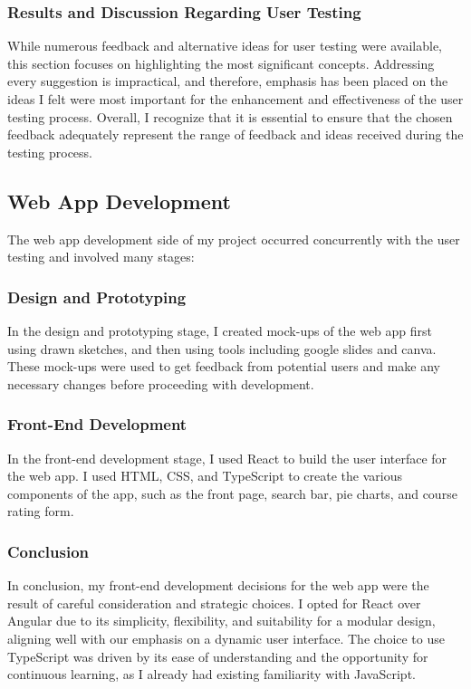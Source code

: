 \documentclass[10pt,twocolumn]{article}
\begin{document}
\subsubsection{Results and Discussion Regarding User Testing}

While numerous feedback and alternative ideas for user testing were available, this section focuses on highlighting the most significant concepts. Addressing every suggestion is impractical, and therefore, emphasis has been placed on the ideas I felt were most important for the enhancement and effectiveness of the user testing process. Overall, I recognize that it is essential to ensure that the chosen feedback adequately represent the range of feedback and ideas received during the testing process.

\subsection{Web App Development}
The web app development side of my project occurred concurrently with the user testing and involved many stages: 

\subsubsection{Design and Prototyping}
In the design and prototyping stage, I created mock-ups of the web app first using drawn sketches, and then using tools including google slides and canva. These mock-ups were used to get feedback from potential users and make any necessary changes before proceeding with development.

\subsubsection{Front-End Development}
In the front-end development stage, I used React to build the user interface for the web app. I used HTML, CSS, and TypeScript to create the various components of the app, such as the front page, search bar, pie charts, and course rating form.

\subsubsection{Conclusion}
In conclusion, my front-end development decisions for the web app were the result of careful consideration and strategic choices. I opted for React over Angular due to its simplicity, flexibility, and suitability for a modular design, aligning well with our emphasis on a dynamic user interface. The choice to use TypeScript was driven by its ease of understanding and the opportunity for continuous learning, as I already had existing familiarity with JavaScript.
\end{document}
